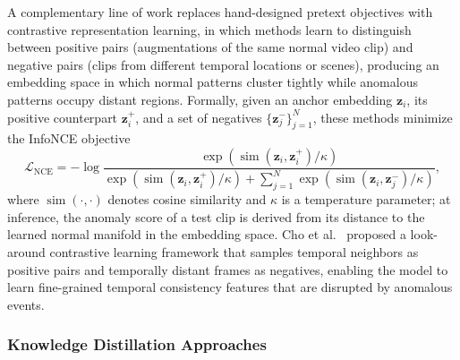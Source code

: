 \documentclass[10pt,a4paper]{article}
\begin{document}
A complementary line of work replaces hand-designed pretext objectives with contrastive representation learning, in which methods learn to distinguish between positive pairs (augmentations of the same normal video clip) and negative pairs (clips from different temporal locations or scenes), producing an embedding space in which normal patterns cluster tightly while anomalous patterns occupy distant regions. Formally, given an anchor embedding $\mathbf{z}_i$, its positive counterpart $\mathbf{z}_i^{+}$, and a set of negatives $\{\mathbf{z}_j^{-}\}_{j=1}^{N}$, these methods minimize the InfoNCE objective
\begin{equation}
    \mathcal{L}_{\text{NCE}} = -\log \frac{\exp\!\left(\operatorname{sim}(\mathbf{z}_i, \mathbf{z}_i^{+})/\kappa\right)}{\exp\!\left(\operatorname{sim}(\mathbf{z}_i, \mathbf{z}_i^{+})/\kappa\right) + \sum_{j=1}^{N} \exp\!\left(\operatorname{sim}(\mathbf{z}_i, \mathbf{z}_j^{-})/\kappa\right)}, \label{eq:infonce}
\end{equation}
where $\operatorname{sim}(\cdot,\cdot)$ denotes cosine similarity and $\kappa$ is a temperature parameter; at inference, the anomaly score of a test clip is derived from its distance to the learned normal manifold in the embedding space. Cho et al.~\citeyearpar{cho2023look} proposed a look-around contrastive learning framework that samples temporal neighbors as positive pairs and temporally distant frames as negatives, enabling the model to learn fine-grained temporal consistency features that are disrupted by anomalous events.

\subsubsection{Knowledge Distillation Approaches}
\end{document}
